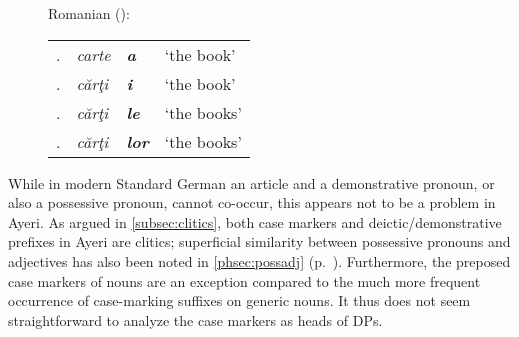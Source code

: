 \begin{figure}
\begin{minipage}[t]{.55\remaining}
\a\label{ex:romdecl}%
Romanian (\cite[75]{lyons1999}):\medskip\\ %
\begin{tabular}[t]{@{} l >{\itshape}l @{} >{\itshape\bfseries}l l}
\Pri{}.\Sg{}
	& carte & a
	& `the book'
	\\

\Obl{}.\Sg{}
	& cărţi & i
	& `the book'
	\\

\Pri{}.\Pl{}
	& cărţi & le
	& `the books'
	\\

\Obl{}.\Pl{}
	& cărţi & lor
	& `the books'
	\\
\end{tabular}
\xe
\end{minipage}
\end{figure}

While in modern Standard German an article and a demonstrative pronoun, or also
a possessive pronoun, cannot co-occur, this appears not to be a problem in
Ayeri. As argued in \autoref{subsec:clitics}, both case markers and
deictic/demonstrative prefixes in Ayeri are clitics; superficial similarity
between possessive pronouns and adjectives has also been noted in
\autoref{phsec:possadj} (p.~\pageref{phsec:possadj}). Furthermore, the preposed
case markers of nouns are an exception compared to the much more frequent
occurrence of case-marking suffixes on generic nouns. It thus does not seem
straightforward to analyze the case markers as heads of DPs.

